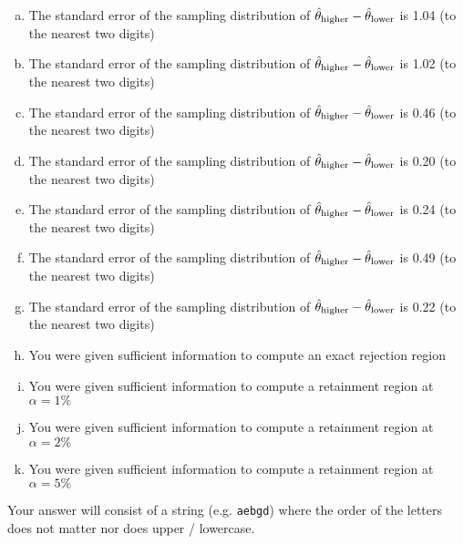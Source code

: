 \documentclass[12pt,landscape]{article}
\newcommand{\instr}{\small Your answer will consist of a string (e.g. \texttt{aebgd}) where the order of the letters does not matter nor does upper / lowercase. \normalsize}
\begin{document}
\begin{enumerate}[(a)]
\item The standard error of the sampling distribution of $\hat{\theta}_{\text{higher}} - \hat{\theta}_{\text{lower}}$ is 1.04 (to the nearest two digits)
\item The standard error of the sampling distribution of $\hat{\theta}_{\text{higher}} - \hat{\theta}_{\text{lower}}$ is 1.02 (to the nearest two digits)
\item The standard error of the sampling distribution of $\hat{\theta}_{\text{higher}} - \hat{\theta}_{\text{lower}}$ is 0.46 (to the nearest two digits)
\item The standard error of the sampling distribution of $\hat{\theta}_{\text{higher}} - \hat{\theta}_{\text{lower}}$ is 0.20 (to the nearest two digits)
\item The standard error of the sampling distribution of $\hat{\theta}_{\text{higher}} - \hat{\theta}_{\text{lower}}$ is 0.24 (to the nearest two digits)
\item The standard error of the sampling distribution of $\hat{\theta}_{\text{higher}} - \hat{\theta}_{\text{lower}}$ is 0.49 (to the nearest two digits)
\item The standard error of the sampling distribution of $\hat{\theta}_{\text{higher}} - \hat{\theta}_{\text{lower}}$ is 0.22 (to the nearest two digits)

\item You were given sufficient information to compute an exact rejection region
\item You were given sufficient information to compute a retainment region at $\alpha = 1\%$
\item You were given sufficient information to compute a retainment region at $\alpha = 2\%$
\item You were given sufficient information to compute a retainment region at $\alpha = 5\%$
\end{enumerate}
\eenum\instr\pagebreak

\end{document}
